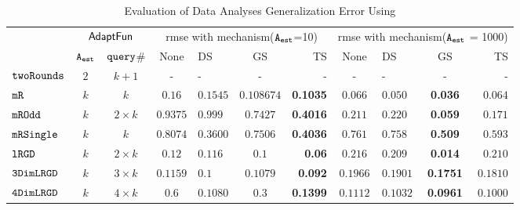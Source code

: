 {\footnotesize
\begin {table}[t]
        \vspace{-0.5cm}
        \caption{Evaluation of Data Analyses Generalization Error Using {\THESYSTEM}}
    \vspace{-0.4cm}
        \label{tb:adapt-generalization}
        \begin{center}
        \centering
{
        \begin{tabular}{|| >{\tiny}l || c | c || c | l | c | r || c | l | c | r || }
                \hhline{t|:=========== :t:|}
        \multirow{2}{*}{Program $c$}
         & \multicolumn{2}{c||}{$\textsf{AdaptFun}$}
         & \multicolumn{4}{c||}{rmse with mechanism(${\mathtt{A_{est}}}$=10)}  & \multicolumn{4}{c||}{rmse with mechanism(${\mathtt{A_{est}}}$ = 1000)}  \\ 
         \hhline{||~--||----||----||}
         & {${\mathtt{A_{est}}}$ } & {${\tt query}$\# }  & None  & DS & GS & TS & None & DS & GS & TS \\ 
         \hline \hline
        $  \mathtt{ twoRounds }$ & $ 2 $ & $  k + 1 $  & -  & - & - & -& -   & - & - & -  \\
        \hhline{||-||---||-||--||----||}
         $  \mathtt{ mR}$ & $k$ & $k$  & $0.16$   & $0.1545$  & $0.108674 $ & \textbf{0.1035}  & $0.066$   & $0.050$ & {\textbf{0.036}} & $0.064$  \\
         \hhline{||-||---||-||--||----||}
         $  \mathtt{ mROdd }$ & $ k $   & $  2 \times k $ & $0.9375$   & $0.999$ & $0.7427$ & {\textbf{0.4016}} & $0.211$   & $0.220$ & {\textbf{0.059}} & $0.171$  \\
         \hhline{||-||---||-||--||----||}
         $  \mathtt{ mRSingle }$ & $ k $ & $  k $  & $0.8074$   & $0.3600$ & $ 0.7506$ & {\textbf{0.4036}} & $ 0.761$   & $ 0.758$ & {\textbf{0.509}} & $ 0.593$  \\
         \hhline{||-||---||-||--||----||}
         $  \mathtt{ lRGD }$ & $ k $ & $  2\times k $  & $0.12$   & $0.116$ & $ 0.1 $ & \textbf{0.06} & $0.216$   & $0.209$ & \textbf{0.014} & $0.210$  \\
         \hhline{||-||---||-||--||----||}
         $  \mathtt{ 3DimLRGD }$ & $ k $ & $  3\times k $  & $0.1159$   & $0.1$ & $0.1079$ & \textbf{0.092} & $0.1966$   & $0.1901$ & \textbf{0.1751} & $0.1810$  \\
         \hhline{||-||---||-||--||----||}
         $  \mathtt{ 4DimLRGD }$ & $ k $ & $  4\times k $   & $0.6$   & $0.1080$ & $0.3 $ & \textbf{0.1399} & $0.1112$   & $0.1032$ & \textbf{0.0961} & $0.1000$  \\

\end{tabular}}
\end{center}
\end{table}}
